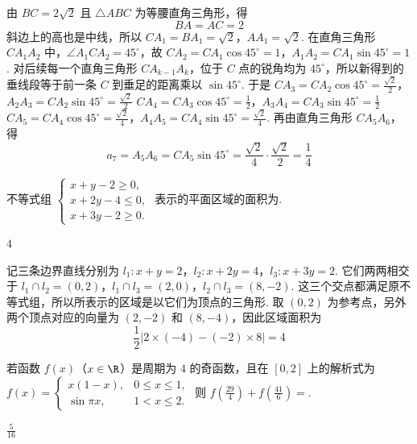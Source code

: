 \begin{solution}
由 \(BC=2\sqrt2\) 且 \(\triangle ABC\) 为等腰直角三角形，得
\[
BA=AC=2
\]
斜边上的高也是中线，所以
\(CA_1=BA_1=\sqrt2\)，\(AA_1=\sqrt2\).
在直角三角形 \(CA_1A_2\) 中，\(\angle A_1CA_2=45^\circ\)，故
\(CA_2=CA_1\cos45^\circ=1\)，\(A_1A_2=CA_1\sin45^\circ=1\).
对后续每一个直角三角形 \(CA_{k-1}A_k\)，位于 \(C\) 点的锐角均为 \(45^\circ\)，所以新得到的垂线段等于前一条 \(C\) 到垂足的距离乘以 \(\sin45^\circ\). 于是
\(CA_3=CA_2\cos45^\circ=\frac{\sqrt2}{2}\)，\(A_2A_3=CA_2\sin45^\circ=\frac{\sqrt2}{2}\)
\(CA_4=CA_3\cos45^\circ=\frac12\)，\(A_3A_4=CA_3\sin45^\circ=\frac12\)
\(CA_5=CA_4\cos45^\circ=\frac{\sqrt2}{4}\)，\(A_4A_5=CA_4\sin45^\circ=\frac{\sqrt2}{4}\).
再由直角三角形 \(CA_5A_6\)，得
\[
a_7=A_5A_6=CA_5\sin45^\circ
=\frac{\sqrt2}{4}\cdot\frac{\sqrt2}{2}
=\frac14
\]
\end{solution}

\begin{problem}
不等式组 \(\begin{cases}
x + y - 2 \geqslant 0,\\
x + 2y - 4 \leqslant 0,\\
x + 3y - 2 \geqslant 0.
\end{cases}\) 表示的平面区域的面积为\fillinblank{}.

\begin{answer}
\(4\)
\end{answer}
\end{problem}

\begin{solution}
记三条边界直线分别为
\(l_1:x+y=2\)，\(l_2:x+2y=4\)，\(l_3:x+3y=2\).
它们两两相交于
\(l_1\cap l_2=(0,2)\)，\(l_1\cap l_3=(2,0)\)，\(l_2\cap l_3=(8,-2)\).
这三个交点都满足原不等式组，所以所表示的区域是以它们为顶点的三角形. 取 \((0,2)\) 为参考点，另外两个顶点对应的向量为 \((2,-2)\) 和 \((8,-4)\)，因此区域面积为
\[
\frac12\left|2\times(-4)-(-2)\times8\right|=4
\]
\end{solution}

\begin{problem}
若函数 \(f(x)\)（\(x \in \R\)）是周期为 \(4\) 的奇函数，且在 \([0, 2]\) 上的解析式为 \(f(x) = \begin{cases}
x(1 - x), & 0 \leqslant x \leqslant 1,\\
\sin \pi x, & 1 < x \leqslant 2.
\end{cases}\) 则 \(f\left(\frac{29}{4}\right) + f\left(\frac{41}{6}\right) =\)\fillinblank{}.

\begin{answer}
\(\frac{5}{16}\)
\end{answer}
\end{problem}

